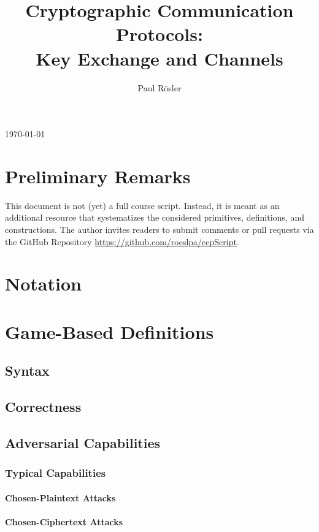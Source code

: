 \documentclass[a4paper,orivec]{llncs}
\title{Cryptographic Communication Protocols:\\Key Exchange and Channels}
\author{Paul Rösler}
\institute{FAU Erlangen-Nürnberg}
\begin{document}
\maketitle
\begin{center}
    \today
\end{center}

\begingroup
\let\clearpage\relax
\tableofcontents
\endgroup

\section{Preliminary Remarks}
This document is not (yet) a full course script.
Instead, it is meant as an additional resource that systematizes the considered primitives, definitions, and constructions.
The author invites readers to submit comments or pull requests via the GitHub Repository \url{https://github.com/roeslpa/ccpScript}.


\section{Notation}

\section{Game-Based Definitions}

\subsection{Syntax}

\subsection{Correctness}

\subsection{Adversarial Capabilities}

\subsubsection{Typical Capabilities}

\paragraph{Chosen-Plaintext Attacks}

\paragraph{Chosen-Ciphertext Attacks}
\end{document}
